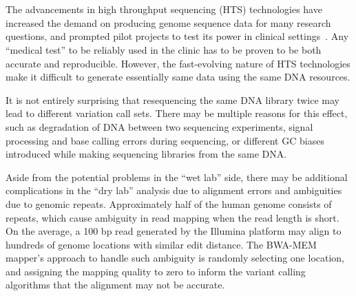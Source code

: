 \documentclass[10pt,a4paper]{article}
\begin{document}
\section*{}
The advancements in high throughput sequencing (HTS) technologies have increased the demand on producing genome sequence data for many research questions, and prompted pilot projects to test its
power in clinical settings~\cite{Biesecker2009}. Any ``medical test'' to be reliably used in the clinic has to be proven to be both accurate and reproducible.
However, the fast-evolving nature of HTS technologies make it difficult to generate essentially same data using the same DNA resources. 

It is not entirely surprising that 
resequencing the same DNA library 
twice 
may lead to different variation call sets.%
There may be multiple reasons for this effect,
such as degradation of DNA between two sequencing experiments, signal processing and base calling errors during sequencing, or different GC biases introduced while making sequencing libraries from the
same DNA.%

Aside from the potential problems in the ``wet lab'' side,%
there may be additional complications in the ``dry lab'' analysis due to alignment errors and ambiguities due to genomic repeats.
Approximately half of the human genome consists of repeats, which cause ambiguity in read mapping when the read length is short. On the average, a 100 bp read generated by the Illumina platform may align to hundreds of genome locations with similar edit distance. 
The BWA-MEM~\cite{Li2009a,Li2013} mapper's  approach to handle such ambiguity is randomly selecting one location, and assigning the mapping quality to zero to inform the variant calling algorithms that the alignment may not be accurate. 
\end{document}
